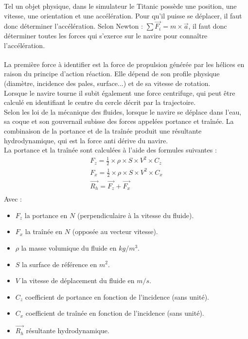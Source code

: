 \documentclass[a4paper,11pt]{article}
\begin{document}
    Tel un objet physique, dans le simulateur le Titanic possède une position, une vitesse, une orientation et une accélération. Pour qu'il puisse se déplacer, il faut donc déterminer l'accélération. Selon Newton : $\sum \overrightarrow{F_{i}} = m \times \overrightarrow{a}$, il faut donc déterminer toutes les forces qui s'exerce sur le navire pour connaître l’accélération.
    \paragraph{}
    La première force à identifier est la force de propulsion générée par les hélices en raison du principe d'action réaction. Elle dépend de son profile physique  (diamètre, incidence des pales, surface...) et de sa vitesse de rotation.\\
    Lorsque le navire tourne il subit également une force centrifuge, qui peut être calculé en identifiant le centre du cercle décrit par la trajectoire.\\
    Selon les loi de la mécanique des fluides, lorsque le navire se déplace dans l'eau, sa coque et son gouvernail subisse des forces appelées portance et traînée.
    La combinaison de la portance et de la traînée produit une résultante hydrodynamique, qui est la force anti dérive du navire.\\
    La portance et la traînée sont calculées à l'aide des formules suivantes :\\
    \begin{gather*}
        F_{z} = \frac{1}{2} \times \rho \times S \times V^{2} \times C_{z}\\
        F_{x} = \frac{1}{2} \times \rho \times S \times V^{2} \times C_{x}\\
        \overrightarrow{R_{h}} = \overrightarrow{F_{z}} + \overrightarrow{F_{x}}\\
    \end{gather*}
    Avec :
    \begin{itemize}
        \item $F_{z}$ la portance en $N$ (perpendiculaire à la vitesse du fluide).
        \item $F_{x}$ la traînée en $N$ (opposée au vecteur vitesse).
        \item $\rho$ la masse volumique du fluide en $kg/m^{3}$.
        \item $S$ la surface de référence en $m^{2}$.
        \item $V$ la vitesse de déplacement du fluide en $m/s$.
        \item $C_{z}$ coefficient de portance en fonction de l'incidence (sans unité).
        \item $C_{x}$ coefficient de traînée en fonction de l'incidence (sans unité).
        \item $\overrightarrow{R_{h}}$ résultante hydrodynamique.
    \end{itemize}
\end{document}
